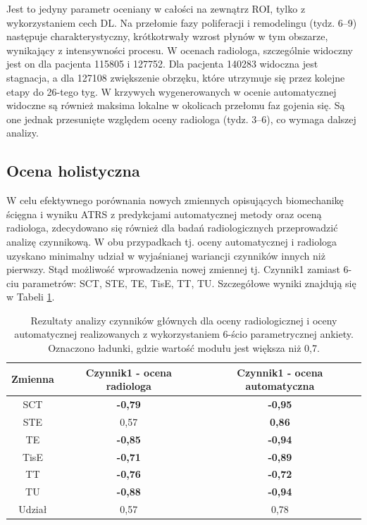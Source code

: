 Jest to jedyny parametr oceniany w całości na zewnątrz ROI, tylko z wykorzystaniem cech DL. Na przełomie fazy poliferacji i remodelingu (tydz. 6--9) następuje charakterystyczny, krótkotrwały wzrost płynów w tym obszarze, wynikający z intensywności procesu. W ocenach radiologa, szczególnie widoczny jest on dla pacjenta 115805 i 127752. Dla pacjenta 140283 widoczna jest stagnacja, \linebreak a dla 127108 zwiększenie obrzęku, które utrzymuje się przez kolejne etapy do 26-tego tyg. W krzywych wygenerowanych w ocenie automatycznej widoczne są również maksima lokalne w okolicach przełomu faz gojenia się. Są one jednak przesunięte względem oceny radiologa (tydz. 3--6), co wymaga dalszej analizy.

\subsection{Ocena holistyczna}

W celu efektywnego porównania nowych zmiennych opisujących biomechanikę ścięgna i wyniku ATRS z predykcjami automatycznej metody oraz oceną radiologa, zdecydowano się również dla badań radiologicznych przeprowadzić analizę czynnikową. W obu przypadkach tj. oceny automatycznej i radiologa uzyskano minimalny udział w wyjaśnianej wariancji czynników innych niż pierwszy. Stąd możliwość wprowadzenia nowej zmiennej tj. Czynnik1 zamiast 6-ciu parametrów: SCT, STE, TE, TisE, TT, TU. Szczegółowe wyniki znajdują się w Tabeli \ref{tab:pca-gt-pred}.

\begin{table}[h]
	\centering
	\setlength{\tabcolsep}{3pt}
	\setlength\extrarowheight{2pt}
	\caption{Rezultaty analizy czynników głównych dla oceny radiologicznej i oceny automatycznej realizowanych z wykorzystaniem 6-ścio parametrycznej ankiety. Oznaczono ładunki, gdzie wartość modułu jest większa niż 0,7.}
	\label{tab:pca-gt-pred}
	\begin{tabular}{c|c|c}
		Zmienna&Czynnik1 - ocena radiologa&Czynnik1 - ocena automatyczna \\
		\hline \hline
		SCT&\textbf{-0,79}&\textbf{-0,95}\\
		\hline
		STE&0,57&\textbf{0,86}\\
		\hline
		TE&\textbf{-0,85}&\textbf{-0,94}\\
		\hline
		TisE&\textbf{-0,71}&\textbf{-0,89}\\
		\hline
		TT&\textbf{-0,76}&\textbf{-0,72}\\
		\hline
		TU&\textbf{-0,88}&\textbf{-0,94}\\
		\hline \hline	
		Udział&0,57&0,78\\
		
	\end{tabular}
\end{table}

